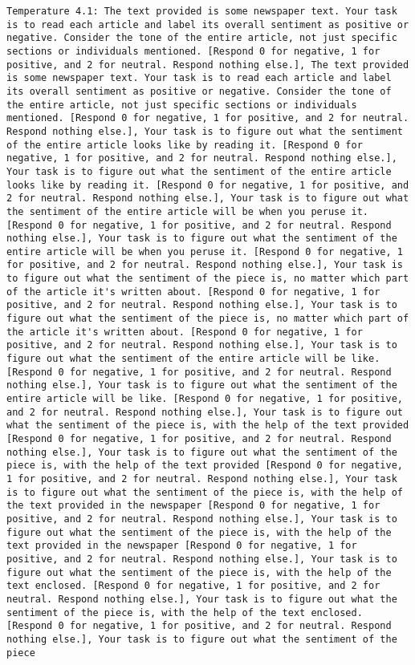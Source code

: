 \begin{lstlisting}[label=lst:poor_performing_prompts]
	Temperature 4.1: The text provided is some newspaper text. Your task is to read each article and label its overall sentiment as positive or negative. Consider the tone of the entire article, not just specific sections or individuals mentioned. [Respond 0 for negative, 1 for positive, and 2 for neutral. Respond nothing else.], The text provided is some newspaper text. Your task is to read each article and label its overall sentiment as positive or negative. Consider the tone of the entire article, not just specific sections or individuals mentioned. [Respond 0 for negative, 1 for positive, and 2 for neutral. Respond nothing else.], Your task is to figure out what the sentiment of the entire article looks like by reading it. [Respond 0 for negative, 1 for positive, and 2 for neutral. Respond nothing else.], Your task is to figure out what the sentiment of the entire article looks like by reading it. [Respond 0 for negative, 1 for positive, and 2 for neutral. Respond nothing else.], Your task is to figure out what the sentiment of the entire article will be when you peruse it. [Respond 0 for negative, 1 for positive, and 2 for neutral. Respond nothing else.], Your task is to figure out what the sentiment of the entire article will be when you peruse it. [Respond 0 for negative, 1 for positive, and 2 for neutral. Respond nothing else.], Your task is to figure out what the sentiment of the piece is, no matter which part of the article it's written about. [Respond 0 for negative, 1 for positive, and 2 for neutral. Respond nothing else.], Your task is to figure out what the sentiment of the piece is, no matter which part of the article it's written about. [Respond 0 for negative, 1 for positive, and 2 for neutral. Respond nothing else.], Your task is to figure out what the sentiment of the entire article will be like. [Respond 0 for negative, 1 for positive, and 2 for neutral. Respond nothing else.], Your task is to figure out what the sentiment of the entire article will be like. [Respond 0 for negative, 1 for positive, and 2 for neutral. Respond nothing else.], Your task is to figure out what the sentiment of the piece is, with the help of the text provided [Respond 0 for negative, 1 for positive, and 2 for neutral. Respond nothing else.], Your task is to figure out what the sentiment of the piece is, with the help of the text provided [Respond 0 for negative, 1 for positive, and 2 for neutral. Respond nothing else.], Your task is to figure out what the sentiment of the piece is, with the help of the text provided in the newspaper [Respond 0 for negative, 1 for positive, and 2 for neutral. Respond nothing else.], Your task is to figure out what the sentiment of the piece is, with the help of the text provided in the newspaper [Respond 0 for negative, 1 for positive, and 2 for neutral. Respond nothing else.], Your task is to figure out what the sentiment of the piece is, with the help of the text enclosed. [Respond 0 for negative, 1 for positive, and 2 for neutral. Respond nothing else.], Your task is to figure out what the sentiment of the piece is, with the help of the text enclosed. [Respond 0 for negative, 1 for positive, and 2 for neutral. Respond nothing else.], Your task is to figure out what the sentiment of the piece 
\end{lstlisting}
